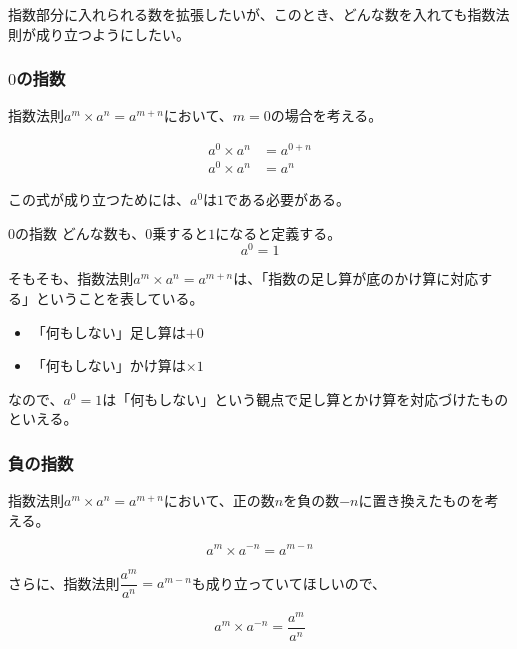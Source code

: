 \documentclass[../math-imaging]{subfiles}
\begin{document}
指数部分に入れられる数を拡張したいが、このとき、どんな数を入れても指数法則が成り立つようにしたい。

\subsubsection{$0$の指数}

指数法則$a^m \times a^n = a^{m+n}$において、$m=0$の場合を考える。

\begin{align}
  a^0 \times a^n & = a^{0+n} \\
  a^0 \times a^n & = a^n
\end{align}

この式が成り立つためには、$a^0$は$1$である必要がある。

\begin{definition}{$0$の指数}
  \newline
  どんな数も、$0$乗すると$1$になると定義する。
  \LARGE
  \begin{equation}
    a^0 = 1
  \end{equation}
\end{definition}

そもそも、指数法則$a^m \times a^n = a^{m+n}$は、「指数の足し算が底のかけ算に対応する」ということを表している。

\begin{itemize}
  \item 「何もしない」足し算は$+ 0$
  \item 「何もしない」かけ算は$\times 1$
\end{itemize}

なので、$a^0 = 1$は「何もしない」という観点で足し算とかけ算を対応づけたものといえる。

\subsubsection{負の指数}

指数法則$a^m \times a^n = a^{m+n}$において、正の数$n$を負の数$-n$に置き換えたものを考える。

\begin{equation}
  a^m \times a^{-n} = a^{m-n}
\end{equation}

さらに、指数法則$\dfrac{a^m}{a^n} = a^{m-n}$も成り立っていてほしいので、

\begin{equation}
  a^m \times a^{-n} = \dfrac{a^m}{a^n}
\end{equation}
\end{document}
